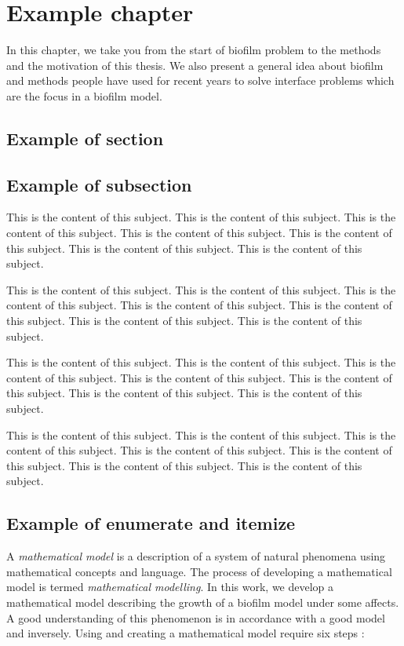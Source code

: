 \documentclass[../main.tex]{subfiles}
\begin{document}
\chapter{Example chapter}

In this chapter, we take you from the start of biofilm problem to the methods and the motivation of this thesis. We also present a general idea about biofilm and methods people have used for recent years to solve interface problems which are the focus in a biofilm model.

\section{Example of section}

\section{Example of subsection}

 This is the content of this subject. This is the content of this subject. This is the content of this subject. This is the content of this subject. This is the content of this subject. This is the content of this subject. This is the content of this subject.

This is the content of this subject. This is the content of this subject. This is the content of this subject. This is the content of this subject. This is the content of this subject. This is the content of this subject. This is the content of this subject.

 This is the content of this subject. This is the content of this subject. This is the content of this subject. This is the content of this subject. This is the content of this subject. This is the content of this subject. This is the content of this subject.

This is the content of this subject. This is the content of this subject. This is the content of this subject. This is the content of this subject. This is the content of this subject. This is the content of this subject. This is the content of this subject. 

\section{Example of enumerate and itemize}

A \textit{mathematical model} is a description of a system of natural phenomena using mathematical concepts and language. The process of developing a mathematical model is termed \textit{mathematical modelling}. In this work, we develop a mathematical model describing the growth of a biofilm model under some affects. A good understanding of this phenomenon is in accordance with a good model and inversely. Using and creating a mathematical model require six steps \cite{wannerBook}:
\end{document}
